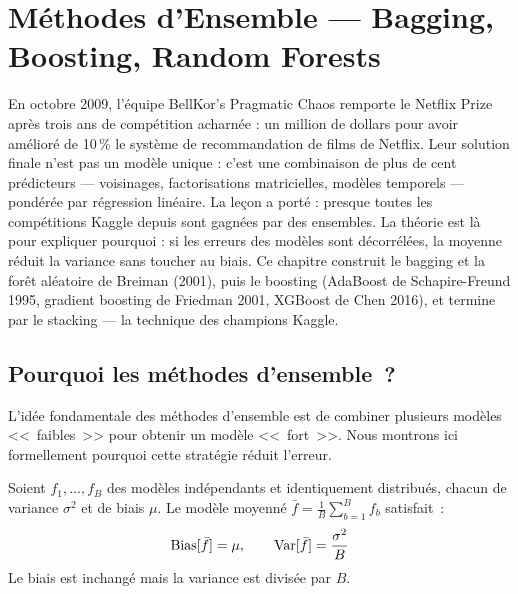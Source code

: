 \chapter{M\'ethodes d'Ensemble --- Bagging, Boosting, Random Forests}
\label{ch:ensembles}

En octobre 2009, l'équipe BellKor's Pragmatic Chaos remporte le Netflix Prize après trois ans de compétition acharnée : un million de dollars pour avoir amélioré de 10\,\% le système de recommandation de films de Netflix. Leur solution finale n'est pas un modèle unique : c'est une combinaison de plus de cent prédicteurs --- voisinages, factorisations matricielles, modèles temporels --- pondérée par régression linéaire. La leçon a porté : presque toutes les compétitions Kaggle depuis sont gagnées par des ensembles. La théorie est là pour expliquer pourquoi : si les erreurs des modèles sont décorrélées, la moyenne réduit la variance sans toucher au biais. Ce chapitre construit le bagging et la forêt aléatoire de Breiman (2001), puis le boosting (AdaBoost de Schapire-Freund 1995, gradient boosting de Friedman 2001, XGBoost de Chen 2016), et termine par le stacking --- la technique des champions Kaggle.

\section{Pourquoi les m\'ethodes d'ensemble~?}
\label{sec:ensembles-pourquoi}

L'id\'ee fondamentale des m\'ethodes d'ensemble est de combiner plusieurs
mod\`eles <<~faibles~>> pour obtenir un mod\`ele <<~fort~>>. Nous montrons
ici formellement pourquoi cette strat\'egie r\'eduit l'erreur.

\begin{theoreme}
\label{thm:variance-reduction}
Soient $f_1, \ldots, f_B$ des mod\`eles ind\'ependants et identiquement
distribu\'es, chacun de variance $\sigma^2$ et de biais $\mu$. Le mod\`ele
moyenn\'e $\bar{f} = \frac{1}{B}\sum_{b=1}^B f_b$ satisfait~:
\begin{equation}
  \mathrm{Bias}[\bar{f}] = \mu, \qquad \mathrm{Var}[\bar{f}] = \frac{\sigma^2}{B}
\end{equation}
Le biais est inchang\'e mais la variance est divis\'ee par $B$.
\end{theoreme}

